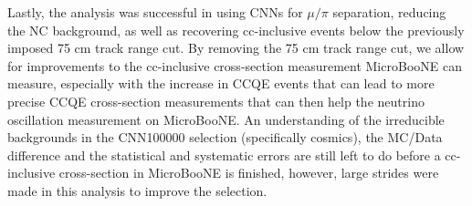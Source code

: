 Lastly, the analysis was successful in using CNNs for $\mu/\pi$ separation, reducing the NC background, as well as recovering cc-inclusive events below the previously imposed 75 cm track range cut. By removing the 75 cm track range cut, we allow for improvements to the cc-inclusive cross-section measurement MicroBooNE can measure, especially with the increase in CCQE events that can lead to more precise CCQE cross-section measurements that can then help the neutrino oscillation measurement on MicroBooNE. An understanding of the irreducible backgrounds in the CNN100000 selection (specifically cosmics), the MC/Data difference and the statistical and systematic errors are still left to do before a cc-inclusive cross-section in MicroBooNE is finished, however, large strides were made in this analysis to improve the selection.  


